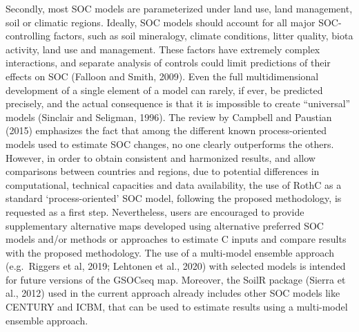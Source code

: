 \documentclass[
  10pt,
  b5paper,
]{book}
\begin{document}
Secondly, most SOC models are parameterized under land use, land management, soil or climatic regions. Ideally, SOC models should account for all major SOC-controlling factors, such as soil mineralogy, climate conditions, litter quality, biota activity, land use and management. These factors have extremely complex interactions, and separate analysis of controls could limit predictions of their effects on SOC (Falloon and Smith, 2009). Even the full multidimensional development of a single element of a model can rarely, if ever, be predicted precisely, and the actual consequence is that it is impossible to create ``universal'' models (Sinclair and Seligman, 1996). The review by Campbell and Paustian (2015) emphasizes the fact that among the different known process-oriented models used to estimate SOC changes, no one clearly outperforms the others. However, in order to obtain consistent and harmonized results, and allow comparisons between countries and regions, due to potential differences in computational, technical capacities and data availability, the use of RothC as a standard `process-oriented' SOC model, following the proposed methodology, is requested as a first step. Nevertheless, users are encouraged to provide supplementary alternative maps developed using alternative preferred SOC models and/or methods or approaches to estimate C inputs and compare results with the proposed methodology. The use of a multi-model ensemble approach (e.g.~Riggers et al, 2019; Lehtonen et al., 2020) with selected models is intended for future versions of the GSOCseq map. Moreover, the SoilR package (Sierra et al., 2012) used in the current approach already includes other SOC models like CENTURY and ICBM, that can be used to estimate results using a multi-model ensemble approach.
\end{document}
